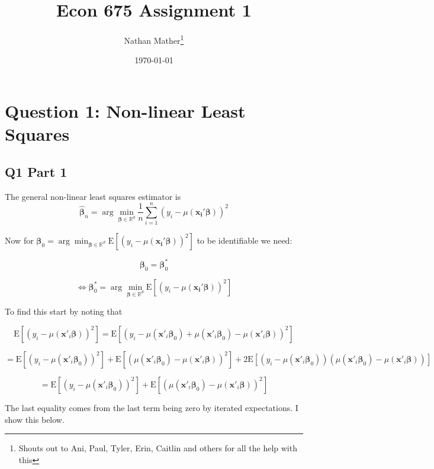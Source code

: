 \documentclass[11pt]{article}
\title{Econ 675 Assignment 1} %
\author{Nathan Mather\thanks{Shouts out to Ani, Paul, Tyler, Erin, Caitlin and others for all the help with this } } %
\date{\today} %
\newcommand{\E}{\mathrm{E}}
\newcommand{\R}{\mathbb{R}}
\begin{document}
	
\maketitle %

\setcounter{tocdepth}{2} %

\tableofcontents %


\section{Question 1: Non-linear Least Squares}
\subsection{Q1 Part 1}

The general non-linear least squares estimator is 
$$ \bm{\hat{\beta}}_n = \arg \min_{\bm{\beta} \in \R^d} \frac{1}{n} \sum_{i=1}^{n}(y_i - \mu(\bm{x_i' \beta}))^2
$$

Now for $  \bm{\beta}_0 = \arg \min_{\bm{\beta} \in \R^d} \E[ (y_i - \mu(\bm{x_i' \beta}))^2]$ to be identifiable we need:

$$ \bm{\beta}_0 =  \bm{\beta}_0^* $$



$$ \iff  \bm{\beta}^*_0 = \arg \min_{\bm{\beta} \in \R^d} \E[ (y_i - \mu(\bm{x_i' \beta}))^2]$$ 

To find this start by noting that 

$$ \E[(y_i - \mu(\bm{x}'_i\bm{\beta}))^2] = \E[(y_i-\mu(\bm{x}'_i\bm{\beta}_0) +\mu(\bm{x}'_i\bm{\beta}_0) -\mu(\bm{x}'_i\bm{\beta})  )^2]
$$

$$ = \E[(y_i-\mu(\bm{x}'_i\bm{\beta}_0))^2] + \E[(\mu(\bm{x}'_i\bm{\beta}_0) -\mu(\bm{x}'_i\bm{\beta}) )^2] + 2\E[(y_i-\mu(\bm{x}'_i\bm{\beta}_0))(\mu(\bm{x}'_i\bm{\beta}_0) -\mu(\bm{x}'_i\bm{\beta})) ]
$$

$$
=\E[(y_i-\mu(\bm{x}'_i\bm{\beta}_0))^2] + \E[(\mu(\bm{x}'_i\bm{\beta}_0) -\mu(\bm{x}'_i\bm{\beta}) )^2]
$$

The last equality comes from the last term being zero by iterated expectations. I show this below. 
\end{document}
